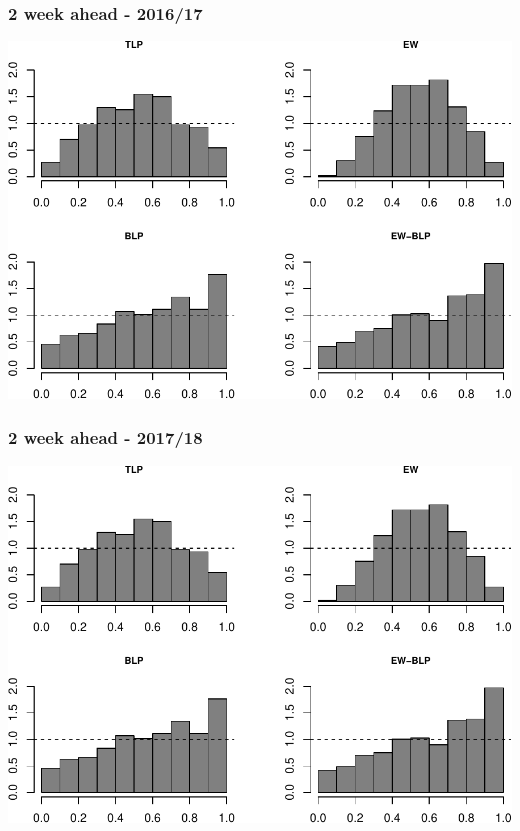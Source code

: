 \documentclass[]{article}
\begin{document}
\hypertarget{week-ahead---201617-1}{%
\subsubsection{2 week ahead - 2016/17}\label{week-ahead---201617-1}}

\includegraphics{BLPcalibration_app_files/figure-latex/unnamed-chunk-8-1.pdf}

\hypertarget{week-ahead---201718-1}{%
\subsubsection{2 week ahead - 2017/18}\label{week-ahead---201718-1}}

\includegraphics{BLPcalibration_app_files/figure-latex/unnamed-chunk-9-1.pdf}
\end{document}

